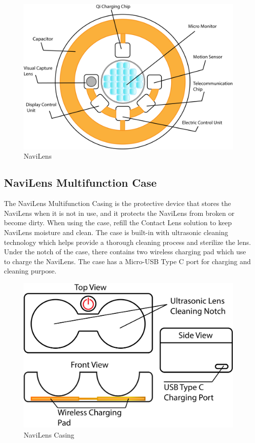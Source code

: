 \documentclass{chi-ext}
\begin{document}
\begin{multicols}{2}
\begin{figure}
 \includegraphics[width=\columnwidth]{NaviLens_Lens.png}
 \caption{NaviLens}
 \label{fig:NaviLens}
\end{figure}

\subsection{NaviLens Multifunction Case}

The NaviLens Multifunction Casing is the protective device that stores the NaviLens when it is not in use, and it protects the NaviLens from broken or become dirty. When using the case, refill the Contact Lens solution to keep NaviLens moisture and clean. The case is built-in with ultrasonic cleaning technology which helps provide a thorough cleaning process and sterilize the lens. Under the notch of the case, there contains two wireless charging pad which use to charge the NaviLens. The case has a  Micro-USB Type C port for charging and cleaning purpose.\\


\begin{figure}
 \includegraphics[width=\columnwidth]{Casing.png}
 \caption{NaviLens Casing}
 \label{fig:Casing}
\end{figure}


\end{multicols}
\end{document}
